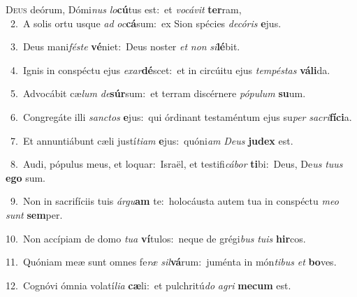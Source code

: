 \lettrine{\initial\textcolor{\initialcolor}{D}}{eus} deórum, Dómi\textit{nus} \textit{lo}\-\textbf{cú}tus est:~\star et \textit{vo}\-\textit{cá}\textit{vit} \textbf{ter}\-ram,\\
{\numbfont\textcolor{\numbcolor}{~2.}}~A solis ortu usque \textit{ad} \textit{oc}\-\textbf{cá}sum:~\star ex Sion spécies \textit{de}\-\textit{có}\textit{ris} \textbf{e}\-jus.\par
{\numbfont\textcolor{\numbcolor}{~3.}}~Deus mani\-\textit{fés}\-\textit{te} \textbf{vé}\-niet:~\star Deus noster \textit{et} \textit{non} \textit{si}\-\textbf{lé}bit.\par
{\numbfont\textcolor{\numbcolor}{~4.}}~Ignis in conspéctu ejus \textit{ex}\-\textit{ar}\textbf{dé}scet:~\star et in circúitu ejus \textit{tem}\-\textit{pés}\textit{tas} \textbf{vá}\-\textbf{li}da.\par
{\numbfont\textcolor{\numbcolor}{~5.}}~Advocábit cæ\textit{lum} \textit{de}\-\textbf{súr}sum:~\star et terram discérnere \textit{pó}\-\textit{pu}\textit{lum} \textbf{su}\-um.\par
{\numbfont\textcolor{\numbcolor}{~6.}}~Congregáte illi \textit{sanc}\-\textit{tos} \textbf{e}\-jus:~\star qui órdinant testaméntum ejus su\textit{per} \textit{sa}\-\textit{cri}\textbf{fí}\textbf{ci}a.\par
{\numbfont\textcolor{\numbcolor}{~7.}}~Et annuntiábunt cæli justí\-\textit{ti}\-\textit{am} \textbf{e}\-jus:~\star quóni\textit{am} \textit{De}\-\textit{us} \textbf{ju}\-\textbf{dex} est.\par
{\numbfont\textcolor{\numbcolor}{~8.}}~Audi, pópulus meus, et loquar:~\dagger Israël, et testifi\-\textit{cá}\-\textit{bor} \textbf{ti}\-bi:~\star Deus, De\textit{us} \textit{tu}\-\textit{us} \textbf{e}\-\textbf{go} sum.\par
{\numbfont\textcolor{\numbcolor}{~9.}}~Non in sacrifíciis tuis \textit{ár}\-\textit{gu}\textbf{am} te:~\star holocáusta autem tua in conspéctu \textit{me}\-\textit{o} \textit{sunt} \textbf{sem}\-per.\par
{\numbfont\textcolor{\numbcolor}{10.}}~Non accípiam de domo \textit{tu}\-\textit{a} \textbf{ví}\-tulos:~\star neque de grégi\textit{bus} \textit{tu}\-\textit{is} \textbf{hir}\-cos.\par
{\numbfont\textcolor{\numbcolor}{11.}}~Quóniam meæ sunt omnes fe\textit{ræ} \textit{sil}\-\textbf{vá}rum:~\star juménta in món\-\textit{ti}\-\textit{bus} \textit{et} \textbf{bo}\-ves.\par
{\numbfont\textcolor{\numbcolor}{12.}}~Cognóvi ómnia volatí\-\textit{li}\-\textit{a} \textbf{cæ}\-li:~\star et pulchritú\textit{do} \textit{a}\-\textit{gri} \textbf{me}\-\textbf{cum} est.\par
